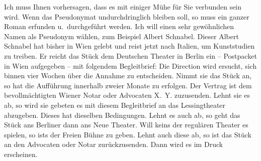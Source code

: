 \pstart
           Ich muss Ihnen vorhersagen, dass es mit einiger Mühe für Sie verbunden sein wird.
               Wenn das Pseudonymat undurchdringlich bleiben soll, so muss ein ganzer Roman erfunden
               u. durchgeführt werden. Ich will einen sehr gewöhnlichen Namen als Pseudonym wählen,
               zum Beispiel Albert Schnabel. Dieser Albert Schnabel hat bisher in Wien gelebt und  reist jetzt
               nach Italien, um Kunststudien zu treiben. Er
               reicht das Stück dem Deutschen Theater in Berlin ein – Postpacket in Wien aufgegeben – mit folgendem Begleitbrief: Die Direction wird ersucht,
               sich binnen vier Wochen über die Annahme zu entscheiden. Nimmt sie das Stück an, so hat die Aufführung
               innerhalb zweier Monate zu erfolgen. Der Vertrag ist dem bevollmächtigten Wiener
               Notar oder Advocaten X. Y. zuzusenden. Lehnt sie es ab, so wird sie gebeten es mit
               diesem Begleitbrief an das Lessingtheater abzugeben. Dieses hat dieselben
               Bedingungen. Lehnt es auch ab, so geht das Stück ans Berliner dann
               ans Neue Theater. Will keins der {\pb}regulären Theater es spielen, so ists
               der Freien Bühne zu geben. Lehnt auch diese ab,
               so ist das Stück an den
               Advocaten oder Notar zurückzusenden. Dann wird es im Druck erscheinen.\pend
           
